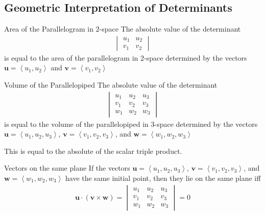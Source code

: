 \documentclass[\main/notes.tex]{subfiles}
\begin{document}
			\subsection{Geometric Interpretation of Determinants}
				\begin{definition}{Area of the Parallelogram in $2$-space}
					The absolute value of the determinant
					\begin{align*}
						\begin{vmatrix}
							u_{1} & u_{2}\\
							v_{1} & v_{2}
						\end{vmatrix}
					\end{align*}
					is equal to the area of the parallelogram in $2$-space determined by the vectors $\mathbf{u} = \left\langle u_{1}, u_{2}\right\rangle $ and $\mathbf{v} = \left\langle v_{1}, v_{2}\right\rangle $
				\end{definition}
				\begin{definition}{Volume of the Parallelopiped}
					The absolute value of the determinant
					\begin{align*}
						\begin{vmatrix}
							u_{1} & u_{2} & u_{3}\\
							v_{1} & v_{2} & v_{3}\\
							w_{1} & w_{2} & w_{3}
						\end{vmatrix}
					\end{align*}
					is equal to the volume of the parallelopiped in $3$-space determined by the vectors $\mathbf{u} = \left\langle u_{1}, u_{2}, u_{3}\right\rangle $, $\mathbf{v} = \left\langle v_{1}, v_{2}, v_{3}\right\rangle $, and $\mathbf{w} = \left\langle w_{1}, w_{2}, w_{3}\right\rangle $

					This is equal to the absolute of the scalar triple product.
				\end{definition}
				\begin{definition}{Vectors on the same plane}
					If the vectors $\mathbf{u} = \left\langle u_{1}, u_{2}, u_{3}\right\rangle $, $\mathbf{v} = \left\langle v_{1}, v_{2}, v_{3}\right\rangle $, and $\mathbf{w} = \left\langle w_{1}, w_{2}, w_{3}\right\rangle $ have the same initial point, then they lie on the same plane iff
					\begin{align*}
						\mathbf{u} \cdot (\mathbf{v} \times \mathbf{w}) = \begin{vmatrix}
							u_{1} & u_{2} & u_{3}\\
							v_{1} & v_{2} & v_{3}\\
							w_{1} & w_{2} & w_{3}
						\end{vmatrix} = 0
					\end{align*}
				\end{definition}
		\pagebreak
\end{document}
